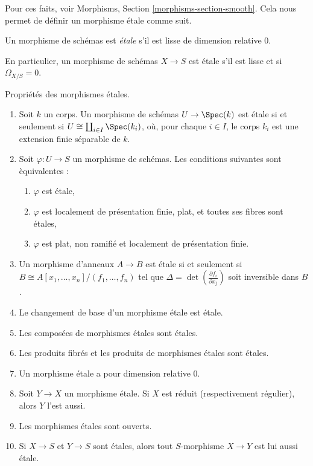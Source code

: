 \medskip\noindent
Pour ces faits, voir
Morphisms, Section \ref{morphisms-section-smooth}.
Cela nous permet de d\'efinir un morphisme \'etale comme suit.

\begin{definition}
\label{definition-etale-morphism}
Un morphisme de sch\'emas est {\it \'etale} s'il est lisse de dimension relative 0.
\end{definition}

\noindent
En particulier, un morphisme de sch\'emas $X \to S$ est \'etale s'il est lisse
et si $\Omega_{X/S} = 0$.

\begin{proposition}
\label{proposition-etale-morphisms}
Propri\'et\'es des morphismes \'etales.
\begin{enumerate}
\item Soit $k$ un corps. Un morphisme de sch\'emas $U \to \Spec(k)$ est
\'etale si et seulement si $U \cong \coprod_{i \in I} \Spec(k_i)$,
o\`u, pour chaque $i \in I$,
le corps $k_i$ est une extension finie s\'eparable de $k$.
\item Soit $\varphi : U \to S$ un morphisme de sch\'emas. Les
conditions suivantes sont \`equivalentes :
\begin{enumerate}
\item $\varphi$ est \'etale,
\item $\varphi$ est localement de pr\'esentation finie, plat, et toutes ses fibres sont
\'etales,
\item $\varphi$ est plat, non ramifi\'e et localement de pr\'esentation finie.
\end{enumerate}
\item Un morphisme d'anneaux $A \to B$ est \'etale si et seulement si
$B \cong A[x_1, \ldots, x_n]/(f_1, \ldots, f_n)$
tel que $\Delta = \det \left( \frac{\partial f_i}{\partial x_j} \right)$
soit inversible dans $B$.
\item Le changement de base d'un morphisme \'etale est \'etale.
\item Les compos\'ees de morphismes \'etales sont \'etales.
\item Les produits fibr\'es et les produits de morphismes \'etales sont \'etales.
\item Un morphisme \'etale a pour dimension relative 0.
\item Soit $Y \to X$ un morphisme \'etale.
Si $X$ est r\'eduit (respectivement r\'egulier), alors $Y$ l'est aussi.
\item Les morphismes \'etales sont ouverts.
\item Si $X \to S$ et $Y \to S$ sont \'etales, alors tout
$S$-morphisme $X \to Y$ est lui aussi \'etale.
\end{enumerate}
\end{proposition}

